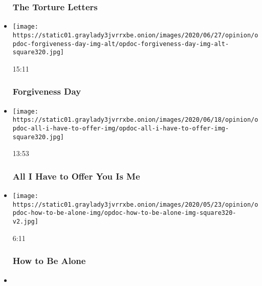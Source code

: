 \begin{itemize}
{  \subsubsection{The Torture Letters}\label{the-torture-letters}}
\item
  \href{https://www.nytimes3xbfgragh.onion/video/opinion/100000007172575/forgiveness-day.html?action=click\&module=video-series-bar\&region=header\&pgtype=Article\&playlistId=video/op-docs}{}

  \texttt{[image: https://static01.graylady3jvrrxbe.onion/images/2020/06/27/opinion/opdoc-forgiveness-day-img-alt/opdoc-forgiveness-day-img-alt-square320.jpg]}

  15:11

  \hypertarget{forgiveness-day}{%
  \subsubsection{Forgiveness Day}\label{forgiveness-day}}
\item
  \href{https://www.nytimes3xbfgragh.onion/video/opinion/100000007133685/all-i-have-to-offer-you-is-me.html?action=click\&module=video-series-bar\&region=header\&pgtype=Article\&playlistId=video/op-docs}{}

  \texttt{[image: https://static01.graylady3jvrrxbe.onion/images/2020/06/18/opinion/opdoc-all-i-have-to-offer-img/opdoc-all-i-have-to-offer-img-square320.jpg]}

  13:53

  \hypertarget{all-i-have-to-offer-you-is-me}{%
  \subsubsection{All I Have to Offer You Is
  Me}\label{all-i-have-to-offer-you-is-me}}
\item
  \href{https://www.nytimes3xbfgragh.onion/video/opinion/100000007139379/how-to-be-alone.html?action=click\&module=video-series-bar\&region=header\&pgtype=Article\&playlistId=video/op-docs}{}

  \texttt{[image: https://static01.graylady3jvrrxbe.onion/images/2020/05/23/opinion/opdoc-how-to-be-alone-img/opdoc-how-to-be-alone-img-square320-v2.jpg]}

  6:11

  \hypertarget{how-to-be-alone}{%
  \subsubsection{How to Be Alone}\label{how-to-be-alone}}
\item
  \href{https://www.nytimes3xbfgragh.onion/video/opinion/100000006590759/container-greece-migrants.html?action=click\&module=video-series-bar\&region=header\&pgtype=Article\&playlistId=video/op-docs}{}


\end{itemize}
